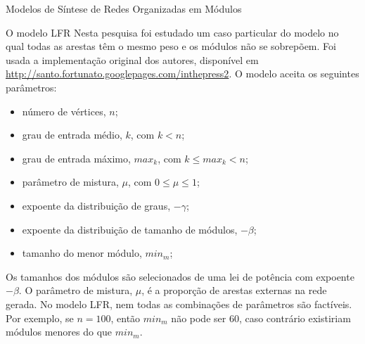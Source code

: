 \begin{section}{Modelos de Síntese de Redes Organizadas em Módulos}
\begin{subsection}{O modelo LFR}
Nesta pesquisa foi estudado um caso particular do modelo no qual todas as arestas têm o mesmo peso e os módulos não se sobrepõem. Foi usada a implementação original dos autores, disponível em  \url{http://santo.fortunato.googlepages.com/inthepress2}. O modelo aceita os seguintes parâmetros:

\begin{itemize}
\item número de vértices, $n$;
\item grau de entrada médio, $k$, com $k < n$;
\item grau de entrada máximo, $max_k$, com $k \le max_k < n$;
\item parâmetro de mistura, $\mu$, com $0 \le \mu \le 1$;
\item expoente da distribuição de graus, $-\gamma$;
\item expoente da distribuição de tamanho de módulos, $-\beta$;
\item tamanho do menor módulo, $min_m$;
\end{itemize}

Os tamanhos dos módulos são selecionados de uma lei de potência com expoente $-\beta$. O parâmetro de mistura, $\mu$, é a proporção de arestas externas na rede gerada. No modelo LFR, nem todas as combinações de parâmetros são factíveis. Por exemplo, se $n = 100$, então $min_m$ não pode ser 60, caso contrário existiriam módulos menores do que $min_m$.

	

\end{subsection}
\end{section}
